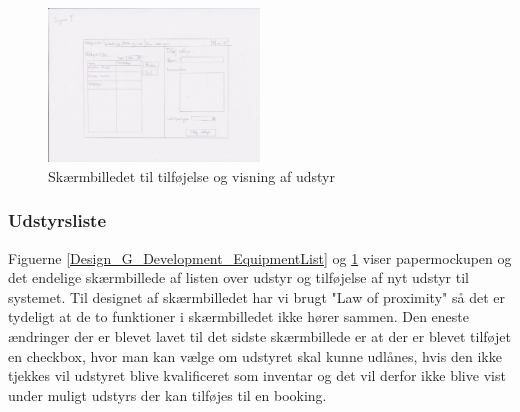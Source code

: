 \begin{figure}[h!]
  \centering
    \includegraphics[width=0.5\textwidth]{Appendix/GUI-Prototype/PaperMockup/UdstyrsListe}
  \caption{Skærmbilledet til tilføjelse og visning af udstyr}
\label{Design_G_Development_EquipmentList_Final}
\end{figure}

\subsubsection{Udstyrsliste}
Figuerne \ref{Design_G_Development_EquipmentList} og \ref{Design_G_Development_EquipmentList_Final} viser papermockupen og det endelige skærmbillede af listen over udstyr og tilføjelse af nyt udstyr til systemet. Til designet af skærmbilledet har vi brugt "Law of proximity" så det er tydeligt at de to funktioner i skærmbilledet ikke hører sammen. Den eneste ændringer der er blevet lavet til det sidste skærmbillede er at der er blevet tilføjet en checkbox, hvor man kan vælge om udstyret skal kunne udlånes, hvis den ikke tjekkes vil udstyret blive kvalificeret som inventar og det vil derfor ikke blive vist under muligt udstyrs der kan tilføjes til en booking. 